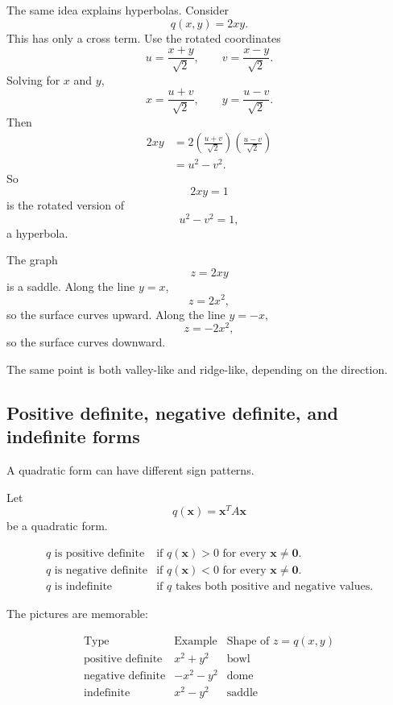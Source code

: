 The same idea explains hyperbolas.  Consider
\[
    q(x,y)=2xy.
\]
This has only a cross term.  Use the rotated coordinates
\[
    u=\frac{x+y}{\sqrt2},
    \qquad
    v=\frac{x-y}{\sqrt2}.
\]
Solving for \(x\) and \(y\),
\[
    x=\frac{u+v}{\sqrt2},
    \qquad
    y=\frac{u-v}{\sqrt2}.
\]
Then
\[
\begin{aligned}
    2xy
    &=
    2\left(\frac{u+v}{\sqrt2}\right)
      \left(\frac{u-v}{\sqrt2}\right)\\
    &=
    u^2-v^2.
\end{aligned}
\]
So
\[
    2xy=1
\]
is the rotated version of
\[
    u^2-v^2=1,
\]
a hyperbola.

The graph
\[
    z=2xy
\]
is a saddle.  Along the line \(y=x\),
\[
    z=2x^2,
\]
so the surface curves upward.  Along the line \(y=-x\),
\[
    z=-2x^2,
\]
so the surface curves downward.

The same point is both valley-like and ridge-like, depending on the direction.

\subsection{Positive definite, negative definite, and indefinite forms}

A quadratic form can have different sign patterns.

\begin{definition}
Let
\[
    q(\mathbf x)=\mathbf x^TA\mathbf x
\]
be a quadratic form.

\[
\begin{array}{ll}
q \text{ is positive definite} &
\text{if } q(\mathbf x)>0 \text{ for every } \mathbf x\neq\mathbf 0.\\[0.4em]
q \text{ is negative definite} &
\text{if } q(\mathbf x)<0 \text{ for every } \mathbf x\neq\mathbf 0.\\[0.4em]
q \text{ is indefinite} &
\text{if } q \text{ takes both positive and negative values.}
\end{array}
\]
\end{definition}

The pictures are memorable:

\[
\begin{array}{c|c|c}
\text{Type} & \text{Example} & \text{Shape of }z=q(x,y)\\ \hline
\text{positive definite} & x^2+y^2 & \text{bowl}\\
\text{negative definite} & -x^2-y^2 & \text{dome}\\
\text{indefinite} & x^2-y^2 & \text{saddle}
\end{array}
\]

